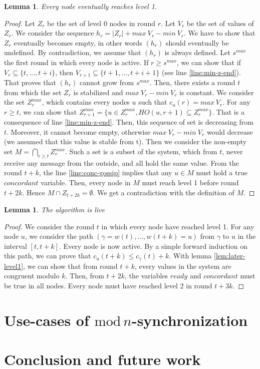 \documentclass[11pt,letterpaper]{article}
\newtheorem{lem}[thm]{Lemma}
\newcommand{\cent}{\gamma}
\begin{document}
\begin{lem}
	Every node eventually reaches level 1.
\end{lem}
\begin{proof}
	Let $Z_r$ be the set of level 0 nodes in round $r$.
	Let $V_r$ be the set of values of $Z_r$.
	We consider the sequence $h_r = |Z_r| + max~V_r - min~V_r$.
	We have to show that $Z_r$ eventually becomes empty, in other words $(h_r)$ should eventually be undefined.
	By contradiction, we assume that $(h_r)$ is always defined.
	Let $s^{max}$ the first round in which every node is active.
	If $r \geq s^{max}$, we can show that if $V_r \subseteq \{t, \dots, t+i\}$, then $V_{r+1} \subseteq \{t+1, \dots , t+i+1\}$ (see line \ref{line:min-z-end}).
	That proves that $(h_r)$ cannot grow from $s^{max}$.
	Then, there exists a round $t$ from which the set $Z_r$ is stabilized and $max~V_r - min~V_r$ is constant.
	We consider the set $Z_r^{max}$, which contains every nodes $u$ such that $c_u(r) = max~V_r$.
	For any $r \geq t$, we can show that $Z_{r+1}^{max} = \{u \in Z_r^{max}, HO(u, r+1) \subseteq Z_r^{max}\}$. That is a consequence of line \ref{line:min-z-end}.
	Then, this sequence of set is decreasing from $t$. Moreover, it cannot become empty, otherwise $max~V_r - min~V_r$ would decrease (we assumed that this value is stable from t).
	Then we consider the non-empty set $M = \bigcap\limits_{r \geq t} Z_r^{max}$.
	Such a set is a subset of the system, which from $t$, never receive any message from the outside, and all hold the same value.
	From the round $t+k$, the line \ref{line:conc-gossip} implies that any $u \in M$ must hold a true $concordant$ variable.
	Then, every node in $M$ must reach level 1 before round $t+2k$. Hence $M \cap Z_{t+2k} = \emptyset$.
	We get a contradiction with the definition of $M$.
\end{proof}

\begin{lem}
	The algorithm is live
\end{lem}
\begin{proof}
	We consider the round $t$ in which every node have reached level 1.
	For any node $u$, we consider the path $(\cent = w(t), \dots, w(t+k) = u)$ from $\cent$ to $u$ in the interval $[t, t+k]$.
	Every node is now active.
	By a simple forward induction on this path, we can prove that $c_u(t+k) \leq c_\cent(t)+k$.
	With lemma \ref{lem:later-level1}, we can show that from round $t+k$, every values in the system are congruent modulo $k$.
	Then, from $t+2k$, the variables $ready$ and $concordant$ must be true in all nodes.
	Every node must have reached level 2 in round $t+3k$.
\end{proof}

\section{Use-cases of $\mathrm{mod}\,n$-synchronization}

\section{Conclusion and future work}


\printbibliography
\end{document}
